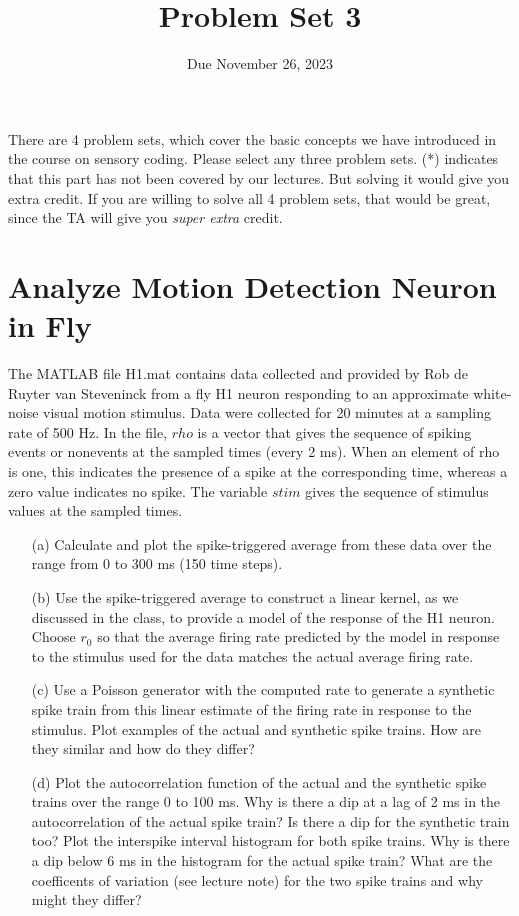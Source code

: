 \documentclass{article}
\title{Problem Set 3}
\date{Due November 26, 2023}
\begin{document}
\maketitle


There are 4 problem sets, which cover the basic concepts we have introduced in the course on sensory coding. Please select any three problem sets.  (*) indicates that this part has not been covered by our lectures. But solving it would give you extra credit.  If you are willing to solve all 4 problem sets, that would be great, since the TA will give you \textit{super extra} credit.


\section*{Analyze Motion Detection Neuron in Fly}

The MATLAB file H1.mat contains data collected and provided by Rob de Ruyter van Steveninck from a fly H1 neuron responding to an approximate white-noise visual motion stimulus. Data were collected for 20 minutes at a sampling rate of 500 Hz. In the file, $rho$ is a vector that gives the sequence of spiking events or nonevents at the sampled times (every 2 ms). When an element of rho is one, this indicates the presence of a spike at the corresponding time, whereas a zero value indicates no spike. The variable $stim$ gives the sequence of stimulus values at the sampled times. 
\begin{enumerate}
\item[(a)] Calculate and plot the spike-triggered average from these data over the range from 0 to 300 ms (150 time steps).

\item[(b)] Use the spike-triggered average to construct a linear kernel, as we discussed in the class, to provide a model of the response of the H1 neuron. Choose $r_0$ so that the average firing rate predicted by the model in response to the stimulus used
for the data matches the actual average firing rate. 

\item[(c)] Use a Poisson generator with the computed rate to generate a synthetic spike train from this linear estimate of the firing rate in response to the stimulus. Plot examples of the actual and synthetic spike trains. How
are they similar and how do they differ? 

\item[(d)]Plot the autocorrelation function of the actual and the synthetic spike trains over the range 0 to 100 ms. Why is there a dip at a lag of 2 ms in the autocorrelation of the actual spike train? Is there a dip for the synthetic train too? Plot the interspike interval histogram for both spike trains. Why is there a dip below 6 ms in the histogram for the actual spike train? What are the coefficents of variation (see lecture note) for the two spike trains and why might they differ? 

\end{enumerate}
 
\end{document}
